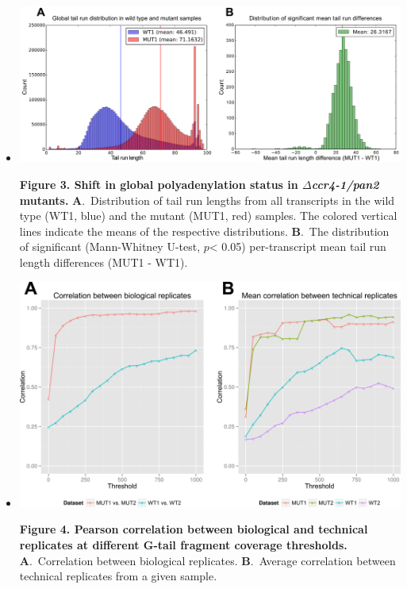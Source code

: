 \documentclass[10pt]{article}
\begin{document}
\begin{itemize}
\item[]{
\includegraphics[scale=0.8]{Figure3.png}




\textbf{Figure 3. Shift in global polyadenylation status in \textit{$\Delta$ccr4-1/pan2} mutants.} \textbf{A}.~Distribution of tail run lengths from all transcripts in the wild type (WT1, blue) and the mutant (MUT1, red) samples. The colored vertical lines indicate the means of the respective distributions.
\textbf{B}.~The distribution of significant (Mann-Whitney U-test, $p$< 0.05) per-transcript mean tail run length differences (MUT1 - WT1).
}



\item[]{
\includegraphics[scale=0.8]{Figure4.png}

\textbf{Figure 4. Pearson correlation between biological and technical replicates at different G-tail fragment coverage thresholds.} \textbf{A}.~Correlation between biological replicates.  \textbf{B}.~Average correlation between technical replicates from a given sample.}






\end{itemize}
\end{document}
